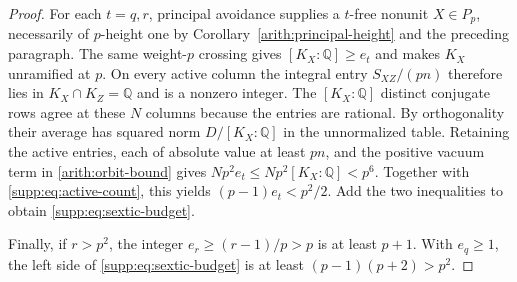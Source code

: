\documentclass[11pt,a4paper]{article}
\numberwithin{equation}{section}
\newcommand{\QQ}{\mathbb Q}
\begin{document}
\begin{proof}
For each $t=q,r$, principal avoidance supplies a $t$-free
nonunit $X\in P_p$, necessarily of $p$-height one by
Corollary~\ref{arith:principal-height} and the preceding paragraph.
The same weight-$p$ crossing gives $[K_X:\mathbb Q]\ge e_t$
and makes $K_X$ unramified at $p$. On every active column
the integral entry $S_{XZ}/(pn)$ therefore lies in
$K_X\cap K_Z=\mathbb Q$ and is a nonzero integer.
The $[K_X:\QQ]$ distinct conjugate rows agree at these $N$
columns because the entries are rational. By orthogonality their
average has squared norm $D/[K_X:\QQ]$ in the unnormalized table.
Retaining the active entries, each of absolute value at least $pn$,
and the positive vacuum term in \eqref{arith:orbit-bound} gives
$N p^2 e_t\le N p^2 [K_X:\QQ]<p^6$. Together with
\eqref{supp:eq:active-count}, this yields
$(p-1)e_t<p^2/2$. Add the two inequalities to obtain
\eqref{supp:eq:sextic-budget}.

Finally, if $r>p^2$, the integer $e_r\ge(r-1)/p>p$
is at least $p+1$. With $e_q\ge1$, the left side of
\eqref{supp:eq:sextic-budget} is at least
$(p-1)(p+2)>p^2$.
\end{proof}
\end{document}
